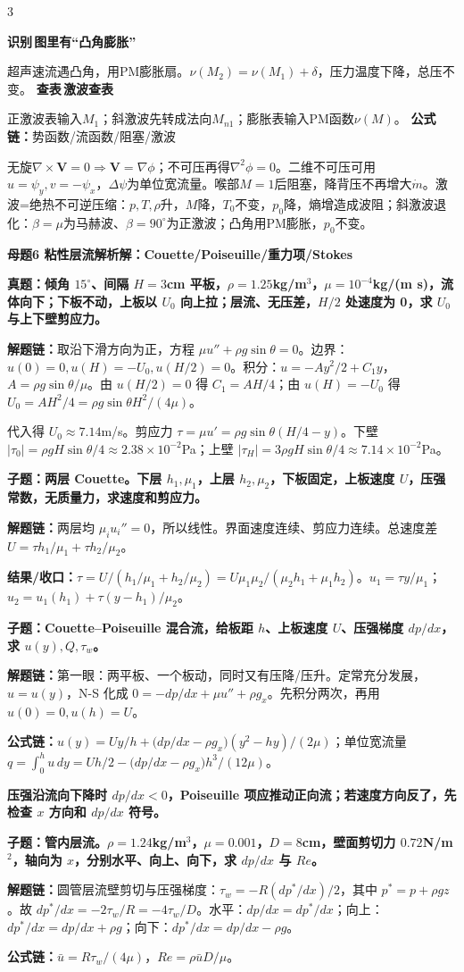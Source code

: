 \documentclass[a4paper]{article}
\newcommand{\mt}[1]{\vspace{0.22pt}\colorbox{M}{\parbox{\dimexpr\linewidth-2\fboxsep}{\color{white}\bfseries #1}}\par}
\newcommand{\qt}[1]{\vspace{0.10pt}\colorbox{Q}{\parbox{\dimexpr\linewidth-2\fboxsep}{\color{white}\bfseries #1}}\par}
\newcommand{\ans}[1]{\colorbox{G}{\parbox{\dimexpr\linewidth-2\fboxsep}{#1}}\par}
\newcommand{\warn}[1]{\colorbox{Y}{\parbox{\dimexpr\linewidth-2\fboxsep}{\color{E}\bfseries #1}}\par}
\newcommand{\chain}[1]{{\color{A}\bfseries 解题链：}#1\par}
\newcommand{\res}[1]{{\color{E}\bfseries 结果/收口：}#1\par}
\newcommand{\form}[1]{{\color{M}\bfseries 公式链：}#1\par}
\newcommand{\labtag}[3]{{\bfseries\color{#1}\colorbox{#1}{\color{white}\fontsize{2.18}{2.28}\selectfont #2}\,#3}\par}
\newcommand{\iden}[1]{\labtag{C}{识别}{#1}}
\newcommand{\lookup}[1]{\labtag{C}{查表}{#1}}
\newcommand{\idq}[1]{\iden{#1}}
\newcommand{\formq}[1]{\form{#1}}
\newcommand{\lookq}[1]{\lookup{#1}}
\newenvironment{vfourWrap}{\par\begingroup\fontsize{2.66}{2.80}\selectfont\setlength{\fboxsep}{0.38pt}}{\par\endgroup}
\begin{document}
\begin{multicols}{3}
\begin{vfourWrap}
\idq{图里有“凸角膨胀”}
超声速流遇凸角，用PM膨胀扇。$\nu(M_2)=\nu(M_1)+\delta$，压力温度下降，总压不变。
\lookq{激波查表}
正激波表输入$M_1$；斜激波先转成法向$M_{n1}$；膨胀表输入PM函数$\nu(M)$。
\formq{势函数/流函数/阻塞/激波}
无旋$\nabla\times\bm V=0\Rightarrow\bm V=\nabla\phi$；不可压再得$\nabla^2\phi=0$。二维不可压可用$u=\psi_y,v=-\psi_x$，$\Delta\psi$为单位宽流量。喉部$M=1$后阻塞，降背压不再增大$\dot m$。激波=绝热不可逆压缩：$p,T,\rho$升，$M$降，$T_0$不变，$p_0$降，熵增造成波阻；斜激波退化：$\beta=\mu$为马赫波、$\beta=90^\circ$为正激波；凸角用PM膨胀，$p_0$不变。
\end{vfourWrap}
\mt{母题6 粘性层流解析解：Couette/Poiseuille/重力项/Stokes}
\qt{真题：倾角 $15^\circ$、间隔 $H=3$cm 平板，$\rho=1.25$kg/m$^3$，$\mu=10^{-4}$kg/(m s)，流体向下；下板不动，上板以 $U_0$ 向上拉；层流、无压差，$H/2$ 处速度为 0，求 $U_0$ 与上下壁剪应力。}
\chain{取沿下滑方向为正，方程 $\mu u''+\rho g\sin\theta=0$。边界：$u(0)=0,u(H)=-U_0,u(H/2)=0$。积分：$u=-Ay^2/2+C_1y$，$A=\rho g\sin\theta/\mu$。由 $u(H/2)=0$ 得 $C_1=AH/4$；由 $u(H)=-U_0$ 得 $U_0=AH^2/4=\rho g\sin\theta H^2/(4\mu)$。}
\ans{代入得 $U_0\approx7.14$m/s。剪应力 $\tau=\mu u'=\rho g\sin\theta(H/4-y)$。下壁 $|\tau_0|=\rho gH\sin\theta/4\approx2.38\times10^{-2}$Pa；上壁 $|\tau_H|=3\rho gH\sin\theta/4\approx7.14\times10^{-2}$Pa。}

\qt{子题：两层 Couette。下层 $h_1,\mu_1$，上层 $h_2,\mu_2$，下板固定，上板速度 $U$，压强常数，无质量力，求速度和剪应力。}
\chain{两层均 $\mu_i u_i''=0$，所以线性。界面速度连续、剪应力连续。总速度差 $U=\tau h_1/\mu_1+\tau h_2/\mu_2$。}
\res{$\tau=U/(h_1/\mu_1+h_2/\mu_2)=U\mu_1\mu_2/(\mu_2h_1+\mu_1h_2)$。$u_1=\tau y/\mu_1$；$u_2=u_1(h_1)+\tau(y-h_1)/\mu_2$。}

\qt{子题：Couette--Poiseuille 混合流，给板距 $h$、上板速度 $U$、压强梯度 $dp/dx$，求 $u(y),Q,\tau_w$。}
\chain{第一眼：两平板、一个板动，同时又有压降/压升。定常充分发展，$u=u(y)$，N-S 化成 $0=-dp/dx+\mu u''+\rho g_x$。先积分两次，再用 $u(0)=0,u(h)=U$。}
\form{$u(y)=Uy/h+\big(dp/dx-\rho g_x\big)(y^2-hy)/(2\mu)$；单位宽流量 $q=\int_0^hu\,dy=Uh/2-\big(dp/dx-\rho g_x\big)h^3/(12\mu)$。}
\warn{压强沿流向下降时 $dp/dx<0$，Poiseuille 项应推动正向流；若速度方向反了，先检查 $x$ 方向和 $dp/dx$ 符号。}

\qt{子题：管内层流。$\rho=1.24$kg/m$^3$，$\mu=0.001$，$D=8$cm，壁面剪切力 $0.72$N/m$^2$，轴向为 $x$，分别水平、向上、向下，求 $dp/dx$ 与 $Re$。}
\chain{圆管层流壁剪切与压强梯度：$\tau_w=-R(dp^*/dx)/2$，其中 $p^*=p+\rho gz$。故 $dp^*/dx=-2\tau_w/R=-4\tau_w/D$。水平：$dp/dx=dp^*/dx$；向上：$dp^*/dx=dp/dx+\rho g$；向下：$dp^*/dx=dp/dx-\rho g$。}
\form{$\bar u=R\tau_w/(4\mu)$，$Re=\rho\bar uD/\mu$。}


\end{multicols}
\end{document}
